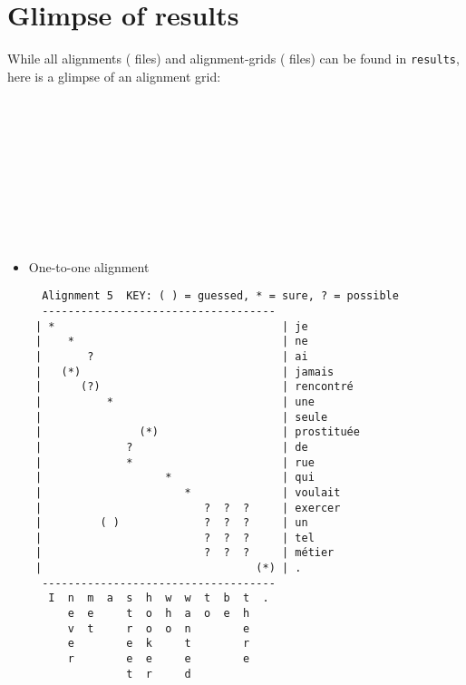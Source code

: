 \documentclass{article}[a4paper]
\begin{document}
\section{Glimpse of results}
While all alignments ( files) and alignment-grids ( files) can be found in \texttt{results}, here is a glimpse of an alignment grid:
\\~\\
\\~\\
\\~\\
\\~\\
\\~\\
\begin{itemize}
    \item One-to-one alignment
    \begin{Verbatim}
  Alignment 5  KEY: ( ) = guessed, * = sure, ? = possible
  ------------------------------------
 | *                                   | je
 |    *                                | ne
 |       ?                             | ai
 |   (*)                               | jamais
 |      (?)                            | rencontré
 |          *                          | une
 |                                     | seule
 |               (*)                   | prostituée
 |             ?                       | de
 |             *                       | rue
 |                   *                 | qui
 |                      *              | voulait
 |                         ?  ?  ?     | exercer
 |         ( )             ?  ?  ?     | un
 |                         ?  ?  ?     | tel
 |                         ?  ?  ?     | métier
 |                                 (*) | .
  ------------------------------------
   I  n  m  a  s  h  w  w  t  b  t  . 
      e  e     t  o  h  a  o  e  h    
      v  t     r  o  o  n        e    
      e        e  k     t        r    
      r        e  e     e        e    
               t  r     d            



\end{Verbatim}
\end{itemize}
\end{document}
